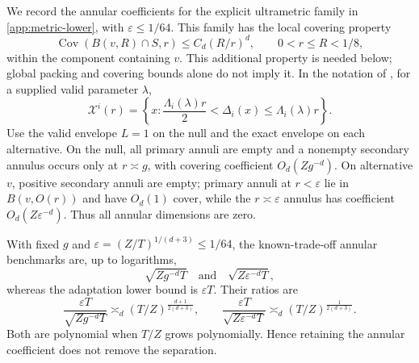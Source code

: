 \documentclass[11pt]{article}
\theoremstyle{definition}
\newcommand{\X}{\mathcal X}
\newcommand{\Cov}{\operatorname{Cov}}
\newcommand{\eps}{\varepsilon}
\begin{document}
We record the annular coefficients for the explicit ultrametric family
in \cref{app:metric-lower}, with $\eps\le1/64$. This family has the
local covering property
\[
 \Cov(B(v,R)\cap S,r)\le C_d(R/r)^d,
 \qquad 0<r\le R<1/8,
\]
within the component containing $v$. This additional property is
needed below; global packing and covering bounds alone do not imply it.  In the notation of \citet{xue2025jmlr}, for a supplied valid parameter $\lambda$,
\[
  \X^i(r)
  =\left\{x:
  \frac{\Lambda_i(\lambda)r}{2}<\Delta_i(x)
  \le\Lambda_i(\lambda)r
  \right\}.
\]
Use the valid envelope $L=1$ on the null and the exact envelope on each alternative. On the null, all primary annuli are empty and a nonempty secondary annulus occurs only at $r\asymp g$, with covering coefficient $O_d(Zg^{-d})$.  On alternative $v$, positive secondary annuli are empty; primary annuli at $r<\eps$ lie in $B(v,O(r))$ and have $O_d(1)$ cover, while the $r\asymp\eps$ annulus has coefficient $O_d(Z\eps^{-d})$.  Thus all annular dimensions are zero.

With fixed $g$ and $\eps=(Z/T)^{1/(d+3)}\le1/64$, the known-trade-off annular benchmarks are, up to logarithms,
\[
  \sqrt{Zg^{-d}T}
  \quad\text{and}\quad
  \sqrt{Z\eps^{-d}T},
\]
whereas the adaptation lower bound is $\eps T$.  Their ratios are
\[
  \frac{\eps T}{\sqrt{Zg^{-d}T}}
  \asymp_d
  (T/Z)^{\frac{d+1}{2(d+3)}},
  \qquad
  \frac{\eps T}{\sqrt{Z\eps^{-d}T}}
  \asymp_d
  (T/Z)^{\frac{1}{2(d+3)}}.
\]
Both are polynomial when $T/Z$ grows polynomially.  Hence retaining the annular coefficient does not remove the separation.
\end{document}
